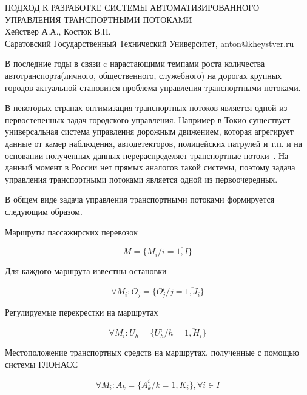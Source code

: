 \documentclass[a4paper,13pt]{article}
\begin{document}
\begin{center} %
    \large ПОДХОД К РАЗРАБОТКЕ СИСТЕМЫ АВТОМАТИЗИРОВАННОГО УПРАВЛЕНИЯ ТРАНСПОРТНЫМИ ПОТОКАМИ\\
    \large Хействер А.А., Костюк В.П.\\
    \large Саратовский Государственный Технический Университет, anton@kheystver.ru
\end{center} %
\thispagestyle{empty} %
В последние годы в связи c нарастающими темпами роста количества автотранспорта(личного, общественного, служебного) на дорогах крупных городов актуальной становится проблема управления транспортными потоками. 

В некоторых странах оптимизация транспортных потоков является одной из первостепенных задач городского управления. Например в Токио существует универсальная система управления дорожным движением, которая агрегирует данные от камер наблюдения, автодетекторов, полицейских патрулей и т.п. и на основании полученных данных перераспределяет транспортные потоки~\cite{pa}. На данный момент в России нет прямых аналогов такой системы, поэтому задача управления транспортными потоками является одной из первоочередных.

В общем виде задача управления транспортными потоками формируется следующим образом.

Маршруты пассажирских перевозок

\begin{equation}\label{eq:marshruts}
M = \{ M_i/i= \overline{1,I} \}
\end{equation}

Для каждого маршрута известны остановки

\begin{equation}\label{eq:stops}
\forall M_i :O_j = \{ O^i_{j}/j = \overline{1,J_i} \}
\end{equation}

Регулируемые перекрестки на маршрутах

\begin{equation}\label{eq:crosses}
\forall M_i :U_h = \{ U^i_{h}/h = \overline{1,H_i} \}
\end{equation}

Местоположение транспортных средств на маршрутах, полученные с помощью системы ГЛОНАСС

\begin{equation}\label{eq:objects}
\forall M_i :A_k = \{ A^i_{k}/k = \overline{1,K_i} \}, \forall{i} \in I
\end{equation}
\end{document}
